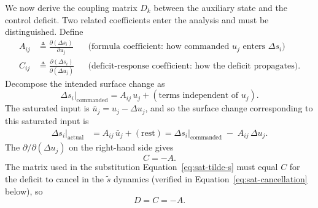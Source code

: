 \documentclass[conf]{new-aiaa}
\begin{document}
We now derive the coupling matrix $D_k$ between the auxiliary state and the control deficit. Two related coefficients enter the analysis and must be distinguished. Define
\begin{align}
\label{eq:sat-A-def}
A_{ij} &\triangleq \frac{\partial (\Delta s_i)}{\partial u_j}
&&\text{(formula coefficient: how commanded $u_j$ enters $\Delta s_i$)} \\
\label{eq:sat-C-def}
C_{ij} &\triangleq \frac{\partial (\Delta s_i)}{\partial (\Delta u_j)}
&&\text{(deficit-response coefficient: how the deficit propagates)}.
\end{align}
Decompose the intended surface change as
\begin{equation}
\Delta s_i \big|_{\mathrm{commanded}} = A_{ij}\, u_j + (\text{terms independent of } u_j).
\end{equation}
The saturated input is $\bar u_j = u_j - \Delta u_j$, and so the surface change corresponding to this saturated input is
\begin{align}
\Delta s_i \big|_{\mathrm{actual}}
&= A_{ij}\, \bar u_j + (\text{rest})
= \Delta s_i \big|_{\mathrm{commanded}} \;-\; A_{ij}\, \Delta u_j.
\end{align}
The $\partial / \partial (\Delta u_j)$ on the right-hand side gives
\begin{equation}
\label{eq:sat-C-equals-minusA}
C = -A.
\end{equation}
The matrix used in the substitution Equation~\ref{eq:sat-tilde-s} must equal $C$ for the deficit to cancel in the $\tilde s$ dynamics (verified in Equation~\ref{eq:sat-cancellation} below), so
\begin{equation}
\label{eq:sat-D-equals-C}
D = C = -A.
\end{equation}
\end{document}
